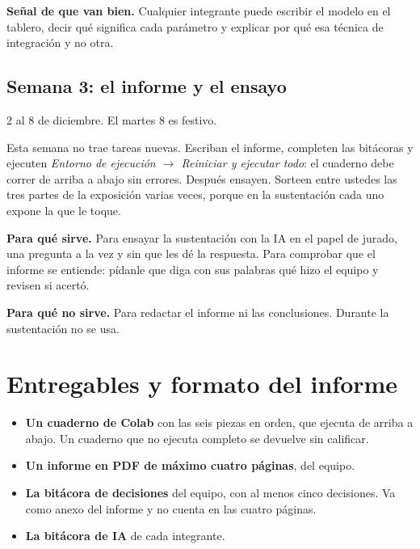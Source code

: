 \documentclass[12pt,letterpaper]{article}
\begin{document}
\textbf{Señal de que van bien.} Cualquier integrante puede escribir el modelo en el tablero, decir qué significa cada parámetro y explicar por qué esa técnica de integración y no otra.

\subsection{Semana 3: el informe y el ensayo}
{\large 2 al 8 de diciembre. El martes 8 es festivo.}

Esta semana no trae tareas nuevas. Escriban el informe, completen las bitácoras y ejecuten \emph{Entorno de ejecución $\to$ Reiniciar y ejecutar todo}: el cuaderno debe correr de arriba a abajo sin errores. Después ensayen. Sorteen entre ustedes las tres partes de la exposición varias veces, porque en la sustentación cada uno expone la que le toque.

\begin{cajaia}
\textbf{Para qué sirve.} Para ensayar la sustentación con la IA en el papel de jurado, una pregunta a la vez y sin que les dé la respuesta. Para comprobar que el informe se entiende: pídanle que diga con sus palabras qué hizo el equipo y revisen si acertó.

\textbf{Para qué no sirve.} Para redactar el informe ni las conclusiones. Durante la sustentación no se usa.
\end{cajaia}

\section{Entregables y formato del informe}
\begin{cajaentrega}
\begin{itemize}[itemsep=0.1em]
    \item \textbf{Un cuaderno de Colab} con las seis piezas en orden, que ejecuta de arriba a abajo. Un cuaderno que no ejecuta completo se devuelve sin calificar.
    \item \textbf{Un informe en PDF de máximo cuatro páginas}, del equipo.
    \item \textbf{La bitácora de decisiones} del equipo, con al menos cinco decisiones. Va como anexo del informe y no cuenta en las cuatro páginas.
    \item \textbf{La bitácora de IA} de cada integrante.
\end{itemize}
\end{cajaentrega}
\end{document}
